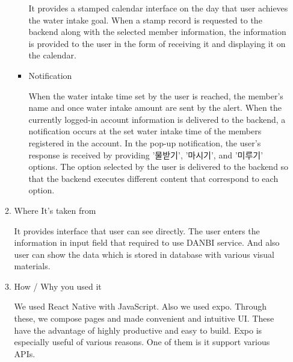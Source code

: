 \documentclass[conference]{IEEEtran}
\begin{document}
\begin{itemize}
\begin{enumerate}
\begin{itemize}
            It provides a stamped calendar interface on the day that user achieves the water intake goal. When a stamp record is requested to the backend along with the selected member information, the information is provided to the user in the form of receiving it and displaying it on the calendar.
            \item Notification
            \setlength{\parindent}{2ex}
            
            When the water intake time set by the user is reached, the member's name and once water intake amount are sent by the alert. When the currently logged-in account information is delivered to the backend, a notification occurs at the set water intake time of the members registered in the account. In the pop-up notification, the user's response is received by providing '물받기', '마시기', and '미루기' options. The option selected by the user is delivered to the backend so that the backend executes different content that correspond to each option.
        \end{itemize}
        
        \item Where It's taken from
        
        It provides interface that user can see directly. The user enters the information in input field that required to use DANBI service. And also user can show the data which is stored in database with various visual materials.
        \item How / Why you used it
        
        We used React Native with JavaScript. Also we used expo. Through these, we compose pages and made convenient and intuitive UI. These have the advantage of highly productive and easy to build. Expo is especially useful of various reasons. One of them is it support various APIs.
    \end{enumerate}
\end{itemize}
\end{document}
